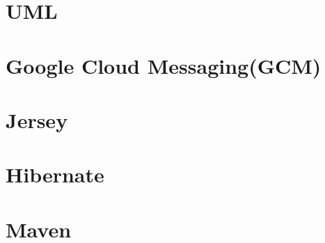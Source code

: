 	\section{UML}
		
	
	\section{Google Cloud Messaging(GCM)}
		
	
	\section{Jersey}
		
	
	\section{Hibernate}
		
		
	\section{Maven}
		

%
%
	



				





